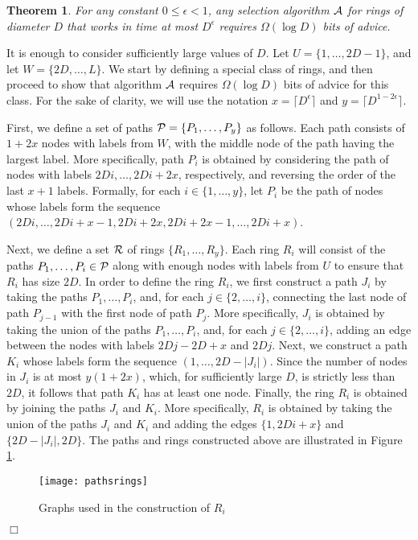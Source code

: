 \documentclass[11pt]{article}
\newtheorem{theorem}{Theorem}[section]
\newcommand{\qed}{\hfill $\Box$ \bigbreak}
\newenvironment{proof}{\noindent {\bf Proof.}}{\qed}
\begin{document}
\begin{theorem}
For any constant $0\leq \epsilon < 1$,  any selection algorithm $\cal A$
for rings of diameter $D$ that works in time at most $D^{\epsilon}$ requires $\Omega(\log D)$ bits of advice. 
\end{theorem}
\begin{proof}
It is enough to consider sufficiently large values of $D$.
Let $U=\{1,\ldots,2D-1\}$, and let $W=\{2D,\ldots,L\}$. We start by defining a special class of rings, and then proceed to show that algorithm $\cal A$ requires $\Omega(\log D)$ bits of advice for this class. For the sake of clarity, we will use the notation $x=\lceil D^{\epsilon} \rceil$ and $y=\lceil D^{1-2\epsilon} \rceil$.

First, we define a set of paths ${\cal P} = \{P_1,\ldots,P_y\}$ as follows. Each path consists of $1+2x$ nodes with labels from $W$, with the middle node of the path having the largest label. More specifically, path $P_i$ is obtained by considering the path of nodes with labels $2Di,\ldots,2Di+2x$, respectively, and reversing the order of the last $x+1$ labels. Formally, for each $i \in \{1,\ldots,y\}$, let $P_i$ be the path of nodes whose labels form the sequence $(2Di,\ldots,2Di+x-1,2Di+2x,2Di+2x-1,\ldots,2Di+x)$.

Next, we define a set $\cal R$ of rings $\{R_1,\ldots,R_y\}$. Each ring $R_i$ will consist of the paths $P_1,\ldots,P_i \in {\cal P}$ along with enough nodes with labels from $U$ to ensure that $R_i$ has size $2D$. In order to define the ring $R_i$, we first construct a path $J_i$ by taking the paths $P_1,\ldots,P_i$, and, for each $j \in \{2,\ldots,i\}$, connecting the last node of path $P_{j-1}$ with the first node of path $P_j$. More specifically, $J_i$ is obtained by taking the union of the paths $P_1,\ldots,P_i$, and, for each $j \in \{2,\ldots,i\}$, adding an edge between the nodes with labels $2Dj - 2D +x$ and $2Dj$. 
Next, we construct a path $K_i$ whose labels form the sequence $(1,\ldots,2D-|J_i|)$. 
Since the number of nodes in $J_i$ is at most $y(1+2x)$, which, for sufficiently large $D$, is strictly less than $2D$, it follows that path $K_i$ has at least one node.
Finally, the ring $R_i$ is obtained by joining the paths $J_i$ and $K_i$. More specifically, $R_i$ is obtained by taking the union of the paths $J_i$ and $K_i$ and adding the edges $\{1,2Di+x\}$ and $\{2D-|J_i|,2D\}$. The paths and rings constructed above are illustrated in Figure \ref{pathsrings}.

\begin{figure}[!ht]
\begin{center}
\texttt{[image: pathsrings]}
\end{center}
\caption{Graphs used in the construction of $R_i$}
\label{pathsrings}
\end{figure}


\end{proof}
\end{document}
